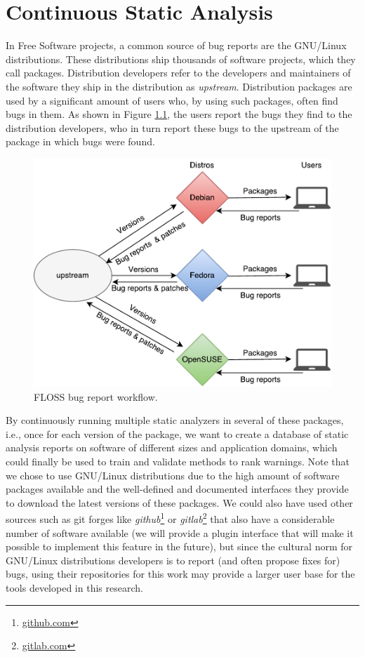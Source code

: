 \chapter{Continuous Static Analysis}
\label{cap:continuous_static_analysis}

In Free Software projects, a common source of bug reports are the GNU/Linux
distributions. These distributions ship thousands of software projects, which
they call packages. Distribution developers refer to the developers and
maintainers of the software they ship in the distribution as \textit{upstream}.
Distribution packages are used by a significant amount of users who, by using
such packages, often find bugs in them. As shown in Figure
\ref{fig:floss_bugs_workflow}, the users report the bugs they find to the
distribution developers, who in turn report these bugs to the upstream of the
package in which bugs were found.

\begin{figure}[!h]
  \centering
  \includegraphics[width=.60\textwidth]{figures/floss_bugs_workflow} 
  \caption{FLOSS bug report workflow.}
  \label{fig:floss_bugs_workflow} 
\end{figure}

By continuously running multiple static analyzers in several of these packages,
i.e., once for each version of the package, we want to create a
database of static analysis reports on software of different sizes and
application domains, which could finally be used to train and validate methods
to rank warnings. Note that we chose to use GNU/Linux distributions due to the
high amount of software packages available and the well-defined and documented
interfaces they provide to download the latest versions of these packages. We
could also have used other sources such as git forges like
\textit{github}\footnote{\url{github.com}} or
\textit{gitlab}\footnote{\url{gitlab.com}} that also have a considerable number
of software available (we will provide a plugin interface that will make it possible to
implement this feature in the future), but since the cultural norm for
GNU/Linux distributions developers is to report (and often propose fixes for)
bugs, using their repositories for this work may provide a larger user base for
the tools developed in this research.

